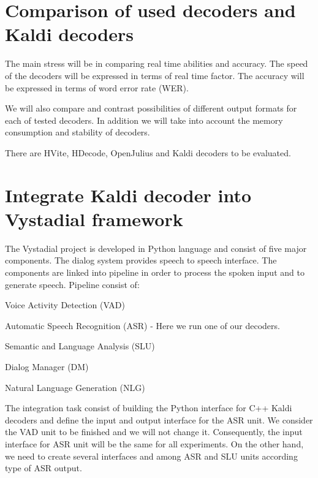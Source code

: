  

\section{Comparison of used decoders and Kaldi decoders} 
\label{sec:compare_real_time_abilities_of_already_used_and_kaldi_decoders}
The main stress will be in comparing real time abilities and accuracy.
The speed of the decoders will be expressed in terms of real time factor.
The accuracy will be expressed in terms of word error rate (WER).

We will also compare and contrast possibilities of different output formats for each of tested decoders.
In addition we will take into account the memory consumption and stability of decoders.

There are HVite, HDecode, OpenJulius and Kaldi decoders to be evaluated.

\section{Integrate Kaldi decoder into Vystadial framework} 
\label{sec:integrate_kaldi_decoder_into_vystadial_framework}
The Vystadial project is developed in Python language and consist of five major components.
The dialog system provides speech to speech interface. The components are linked into pipeline in order to process the spoken input and to generate speech.
Pipeline consist of:
\begin{enumarate}
    \item Voice Activity Detection (VAD)
    \item Automatic Speech Recognition (ASR) - Here we run one of our decoders.
    \item Semantic and Language Analysis (SLU)
    \item Dialog Manager (DM)
    \item Natural Language Generation (NLG)
\end{enumarate}

The integration task consist of building the Python interface for C++ Kaldi decoders and define the input and output interface for the ASR unit. We consider the VAD unit to be finished and we will not change it. Consequently, the input interface for ASR unit will be the same for all experiments. On the other hand, we need to create several interfaces and among ASR and SLU units according type of ASR output.

